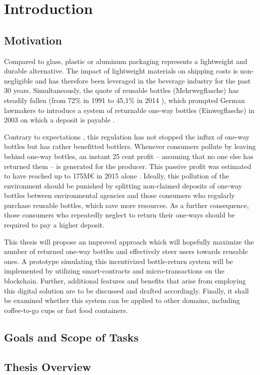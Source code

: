
\chapter{Introduction}

\section{Motivation}
Compared to glass, plastic or aluminum packaging represents a lightweight and durable alternative. The impact of lightweight materials on shipping costs is non-negligible and has therefore been leveraged in the beverage industry for the past 30 years. Simultaneously, the quote of reusable bottles (Mehrwegflasche) has steadily fallen (from 72\% in 1991 \cite[§ 9 Abs. 2]{verpackV} to 45,1\% in 2014 \cite{umweltBundesamt}), which prompted German lawmakers to introduce a system of returnable one-way bottles (Einwegflasche) in 2003 on which a deposit is payable \cite[§ 9 Abs. 2]{verpackV}. 

Contrary to expectations \cite[§ 8]{verpackV} , this regulation has not stopped the influx of one-way bottles but has rather benefitted bottlers. Whenever consumers pollute by leaving behind one-way bottles, an instant 25 cent profit -- assuming that no one else has returned them -- is generated for the producer. This passive profit was estimated to have reached up to 175M\euro{} in 2015 alone \cite{mehrwegSystem}. Ideally, this pollution of the environment should be punished by splitting non-claimed deposits of one-way bottles between environmental agencies and those consumers who regularly purchase reusable bottles, which save more resources. As a further consequence, those consumers who repeatedly neglect to return their one-ways should be required to pay a higher deposit.

This thesis will propose an improved approach which will hopefully maximize the number of returned one-way bottles and effectively steer users towards reusable ones. A prototype simulating this incentivized bottle-return system will be implemented by utilizing smart-contracts and micro-transactions on the blockchain. Further, additional features and benefits that arise from employing this digital solution are to be discussed and drafted accordingly. Finally, it shall be examined whether this system can be applied to other domains, including coffee-to-go cups or fast food containers.

\section{Goals and Scope of Tasks}

\section{Thesis Overview}